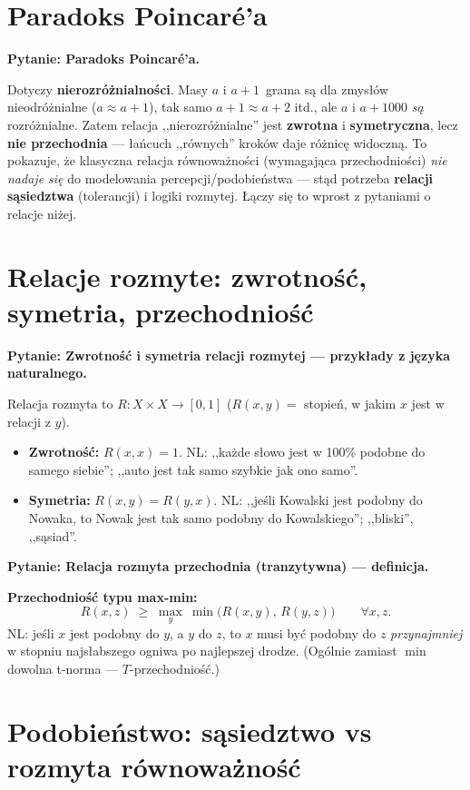 \documentclass[11pt]{article}
\newcommand{\pytan}[1]{\medskip\noindent\textbf{\textcolor{anbg}{Pytanie:} #1}\par\smallskip}
\begin{document}
\section{Paradoks Poincaré'a}

\pytan{Paradoks Poincaré'a.}
Dotyczy \textbf{nierozróżnialności}. Masy $a$ i $a{+}1$~grama są dla zmysłów
nieodróżnialne ($a\approx a{+}1$), tak samo $a{+}1\approx a{+}2$ itd., ale $a$ i
$a{+}1000$ \emph{są} rozróżnialne. Zatem relacja ,,nierozróżnialne'' jest \textbf{zwrotna}
i \textbf{symetryczna}, lecz \textbf{nie przechodnia} --- łańcuch ,,równych'' kroków daje
różnicę widoczną. To pokazuje, że klasyczna relacja równoważności (wymagająca
przechodniości) \emph{nie nadaje się} do modelowania percepcji/podobieństwa --- stąd
potrzeba \textbf{relacji sąsiedztwa} (tolerancji) i logiki rozmytej. Łączy się to wprost z
pytaniami o relacje niżej.

\section{Relacje rozmyte: zwrotność, symetria, przechodniość}

\pytan{Zwrotność i symetria relacji rozmytej --- przykłady z języka naturalnego.}
Relacja rozmyta to $R:X\times X\to[0,1]$ ($R(x,y)=$ stopień, w jakim $x$ jest w relacji z $y$).
\begin{itemize}[leftmargin=*]
\item \textbf{Zwrotność:} $R(x,x)=1$. NL: ,,każde słowo jest w 100\% podobne do samego
  siebie''; ,,auto jest tak samo szybkie jak ono samo''.
\item \textbf{Symetria:} $R(x,y)=R(y,x)$. NL: ,,jeśli Kowalski jest podobny do Nowaka, to
  Nowak jest tak samo podobny do Kowalskiego''; ,,bliski'', ,,sąsiad''.
\end{itemize}

\pytan{Relacja rozmyta przechodnia (tranzytywna) --- definicja.}
\textbf{Przechodniość typu max-min:}
\[
  R(x,z)\;\ge\;\max_{y}\ \min\big(R(x,y),\,R(y,z)\big)\qquad\forall x,z.
\]
NL: jeśli $x$ jest podobny do $y$, a $y$ do $z$, to $x$ musi być podobny do $z$
\emph{przynajmniej} w stopniu najsłabszego ogniwa po najlepszej drodze. (Ogólnie zamiast
$\min$ dowolna t-norma --- $T$-przechodniość.)

\section{Podobieństwo: sąsiedztwo vs rozmyta równoważność}
\end{document}
